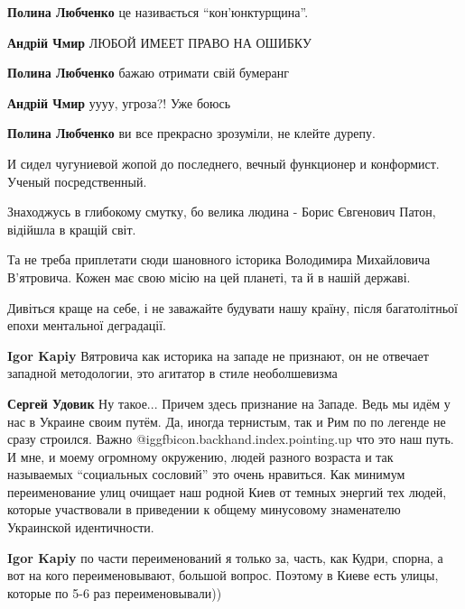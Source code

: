 \begin{itemize}
\begin{itemize}
\begin{itemize}
\textbf{Полина Любченко} це називається \enquote{кон'юнктурщина}.

\textbf{Андрій Чмир} ЛЮБОЙ ИМЕЕТ ПРАВО НА ОШИБКУ

\textbf{Полина Любченко} бажаю отримати свій бумеранг

\textbf{Андрій Чмир} уууу, угроза?!
Уже боюсь

\textbf{Полина Любченко} ви все прекрасно зрозуміли, не клейте дурепу.
\end{itemize} %


И сидел чугуниевой жопой до последнего, вечный функционер и конформист. Ученый
посредственный.

\end{itemize} %


Знаходжусь в глибокому смутку, бо велика людина - Борис Євгенович Патон,
відійшла в кращій світ.

Та не треба приплетати сюди шановного історика Володимира Михайловича
В'ятровича. Кожен має свою місію на цей планеті, та й в нашій державі.

Дивіться краще на себе, і не заважайте будувати нашу країну, після
багатолітньої епохи ментальної деградації.

\begin{itemize} %
\textbf{Igor Kapiy} Вятровича как историка на западе не признают, он не отвечает западной методологии, это агитатор в стиле необолшевизма

\begin{itemize} %
\textbf{Сергей Удовик} Ну такое...
Причем здесь признание на Западе. Ведь мы идём у нас в Украине своим путём. Да, иногда тернистым, так и Рим по по легенде не сразу строился.
Важно @igg{fbicon.backhand.index.pointing.up}  что это наш путь.
И мне, и моему огромному окружению, людей разного возраста и так называемых \enquote{социальных сословий} это очень нравиться.
Как минимум переименование улиц очищает наш родной Киев от темных энергий тех людей, которые участвовали в приведении к общему минусовому знаменателю Украинской идентичности.

\textbf{Igor Kapiy} по части переименований я только за, часть, как Кудри, спорна, а вот на кого переименовывают, большой вопрос. Поэтому в Киеве есть улицы, которые по 5-6 раз переименовывали))


\end{itemize}
\end{itemize}
\end{itemize}
